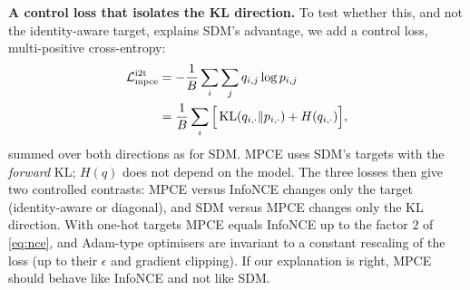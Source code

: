 \textbf{A control loss that isolates the KL direction.} To test whether this, and not the identity-aware target, explains SDM's advantage, we add a control loss, multi-positive cross-entropy:
\begin{align}
\mathcal{L}^{\mathrm{i2t}}_{\mathrm{mpce}}&=-\frac1B\sum_{i}\sum_{j}q_{i,j}\log p_{i,j}\nonumber\\
&=\frac1B\sum_i\Big[\operatorname{KL}(q_{i,\cdot}\Vert p_{i,\cdot})+H(q_{i,\cdot})\Big],\label{eq:mpce}
\end{align}
summed over both directions as for SDM. MPCE uses SDM's targets with the \emph{forward} KL; $H(q)$ does not depend on the model. The three losses then give two controlled contrasts: MPCE versus InfoNCE changes only the target (identity-aware or diagonal), and SDM versus MPCE changes only the KL direction. With one-hot targets MPCE equals InfoNCE up to the factor $2$ of \cref{eq:nce}, and Adam-type optimisers are invariant to a constant rescaling of the loss (up to their $\epsilon$ and gradient clipping). If our explanation is right, MPCE should behave like InfoNCE and not like SDM.
